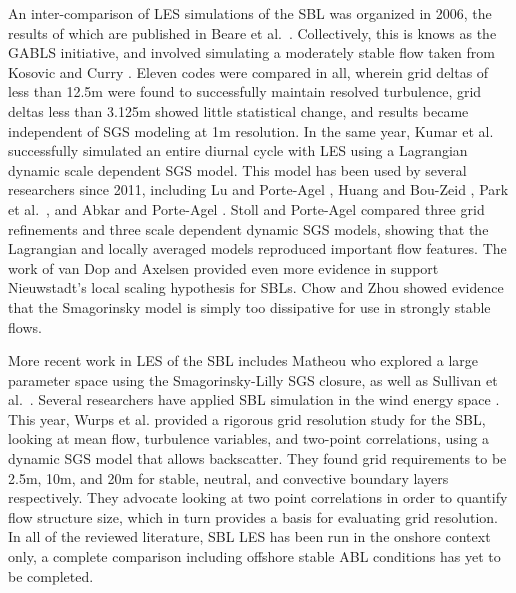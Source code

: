\documentclass[conf]{new-aiaa}
\begin{document}
An inter-comparison of LES simulations of the SBL was organized in 2006, the 
results of which are published in Beare et al.\ \cite{Beare2006}. Collectively, 
this is knows as the GABLS initiative, and involved simulating a moderately 
stable flow taken from Kosovic and Curry \cite{Kosovic2000}. Eleven codes 
were compared in all, wherein grid deltas of less than 12.5m were found to 
successfully maintain resolved turbulence, grid deltas less than 3.125m 
showed little statistical change, and results became independent of SGS 
modeling at 1m resolution. In the same year, Kumar et al. \cite{Kumar2006} 
successfully simulated an entire diurnal cycle with LES using a Lagrangian 
dynamic scale dependent SGS model. This model has been used by several 
researchers since 2011, including Lu and Porte-Agel \cite{Lu2011}, Huang 
and Bou-Zeid \cite{Huang2013}, Park et al.\ \cite{Park2014}, and 
Abkar and Porte-Agel \cite{Abkar2015}. Stoll and Porte-Agel \cite{Stoll2007} 
compared three grid refinements and three scale dependent dynamic SGS models, 
showing that the Lagrangian and locally averaged models reproduced important 
flow features. The work of van Dop and Axelsen \cite{vanDop2007} provided 
even more evidence in support Nieuwstadt's local scaling hypothesis for SBLs. 
Chow and Zhou \cite{Chow2011} showed evidence that the Smagorinsky model is 
simply too dissipative for use in strongly stable flows. 

More recent work in LES of the SBL includes Matheou \cite{Matheou2016} who 
explored a large parameter space using the Smagorinsky-Lilly SGS 
closure, as well as Sullivan et al.\ \cite{sullivan2016turbulent}. Several researchers 
have applied SBL simulation in the wind energy space \cite{Aitken2014, Abkar2015, Ghaisas2017}. 
This year, Wurps et al. \cite{Wurps2020} provided a rigorous grid resolution study for the SBL, 
looking at mean flow, turbulence variables, and two-point correlations, using a dynamic 
SGS model that allows backscatter. They found grid requirements to be 2.5m, 10m, and 20m 
for stable, neutral, and convective boundary layers respectively. They advocate looking 
at two point correlations in order to quantify flow structure size, which in turn 
provides a basis for evaluating grid resolution. In all of the reviewed literature, SBL LES 
has been run in the onshore context only, a complete comparison
including offshore stable ABL conditions has yet to be completed.
\end{document}
